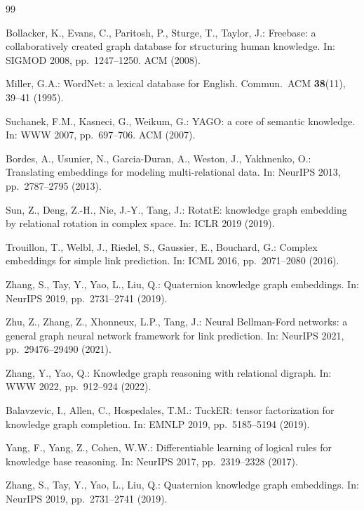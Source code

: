 \documentclass[runningheads]{llncs}
\begin{document}
%
% 
% 
%
\begin{thebibliography}{99}

Bollacker, K., Evans, C., Paritosh, P., Sturge, T., Taylor, J.:
Freebase: a collaboratively created graph database for structuring human
knowledge. In: SIGMOD 2008, pp.~1247--1250. ACM (2008).

Miller, G.A.: WordNet: a lexical database for English.
Commun.\ ACM \textbf{38}(11), 39--41 (1995).

Suchanek, F.M., Kasneci, G., Weikum, G.: YAGO: a core of semantic knowledge.
In: WWW 2007, pp.~697--706. ACM (2007).

Bordes, A., Usunier, N., Garcia-Duran, A., Weston, J., Yakhnenko, O.:
Translating embeddings for modeling multi-relational data.
In: NeurIPS 2013, pp.~2787--2795 (2013).

Sun, Z., Deng, Z.-H., Nie, J.-Y., Tang, J.:
RotatE: knowledge graph embedding by relational rotation in complex space.
In: ICLR 2019 (2019).

Trouillon, T., Welbl, J., Riedel, S., Gaussier, E., Bouchard, G.:
Complex embeddings for simple link prediction.
In: ICML 2016, pp.~2071--2080 (2016).

Zhang, S., Tay, Y., Yao, L., Liu, Q.:
Quaternion knowledge graph embeddings.
In: NeurIPS 2019, pp.~2731--2741 (2019).

Zhu, Z., Zhang, Z., Xhonneux, L.P., Tang, J.:
Neural Bellman-Ford networks: a general graph neural network framework
for link prediction. In: NeurIPS 2021, pp.~29476--29490 (2021).

Zhang, Y., Yao, Q.:
Knowledge graph reasoning with relational digraph.
In: WWW 2022, pp.~912--924 (2022).

Balavzevic, I., Allen, C., Hospedales, T.M.:
TuckER: tensor factorization for knowledge graph completion.
In: EMNLP 2019, pp.~5185--5194 (2019).

Yang, F., Yang, Z., Cohen, W.W.:
Differentiable learning of logical rules for knowledge base reasoning.
In: NeurIPS 2017, pp.~2319--2328 (2017).

Zhang, S., Tay, Y., Yao, L., Liu, Q.:
Quaternion knowledge graph embeddings.
In: NeurIPS 2019, pp.~2731--2741 (2019).


\end{thebibliography}
\end{document}
